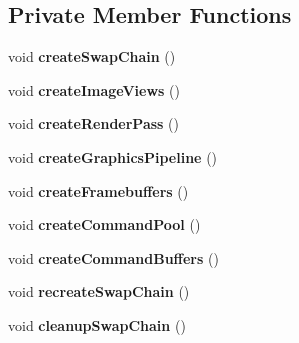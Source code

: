 \subsection*{Private Member Functions}
\begin{DoxyCompactItemize}
\item 
\mbox{\label{classflounder_1_1renderer_a8f00a01ad170f3d09fdf815e1de76b3a}} 
void {\bfseries create\+Swap\+Chain} ()
\item 
\mbox{\label{classflounder_1_1renderer_ae3fdca69503472bcdf6b9aa87dce5ac2}} 
void {\bfseries create\+Image\+Views} ()
\item 
\mbox{\label{classflounder_1_1renderer_aa253ca4d8a07475dbab991e06639d998}} 
void {\bfseries create\+Render\+Pass} ()
\item 
\mbox{\label{classflounder_1_1renderer_a2fc353ce509f062df4909117be3d6080}} 
void {\bfseries create\+Graphics\+Pipeline} ()
\item 
\mbox{\label{classflounder_1_1renderer_ae4f4e61141e8418a470ac6d1d752c150}} 
void {\bfseries create\+Framebuffers} ()
\item 
\mbox{\label{classflounder_1_1renderer_a9112ee44b1429d1398a94acb77a1bb67}} 
void {\bfseries create\+Command\+Pool} ()
\item 
\mbox{\label{classflounder_1_1renderer_a28d74926585909dcea74a87764fc5b56}} 
void {\bfseries create\+Command\+Buffers} ()
\item 
\mbox{\label{classflounder_1_1renderer_a525327630cb750c85b8da1b8fbc1bdc3}} 
void {\bfseries recreate\+Swap\+Chain} ()
\item 
\mbox{\label{classflounder_1_1renderer_af9b014fe2d885cd1f4eeb0c4ec82d8fa}} 
void {\bfseries cleanup\+Swap\+Chain} ()
\item 
\mbox{\label{classflounder_1_1renderer_a67c3032eb4d138eac103a6802100eb0d}} 

\end{DoxyCompactItemize}
